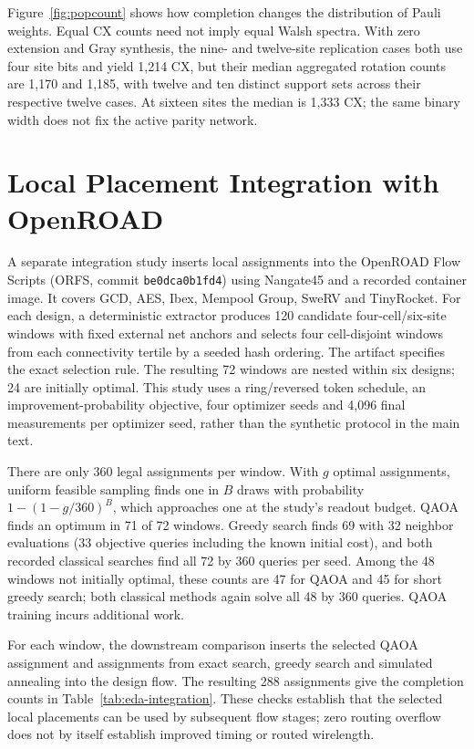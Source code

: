 \documentclass[manuscript,screen,review]{acmart}
\begin{document}
Figure~\ref{fig:popcount} shows how completion changes the distribution of
Pauli weights. Equal CX counts need not imply equal Walsh spectra. With zero extension
and Gray synthesis, the nine- and twelve-site replication cases both use four site bits and yield 1,214 CX, but their median
aggregated rotation counts are 1,170 and 1,185, with twelve and ten distinct
support sets across their respective twelve cases. At sixteen sites the
median is 1,333 CX; the
same binary width does not fix the active parity network.


\section{Local Placement Integration with OpenROAD}
\label{sec:eda}
A separate integration study inserts local assignments into the OpenROAD
Flow Scripts (ORFS, commit \texttt{be0dca0b1fd4}) using Nangate45 and a
recorded container image. It covers GCD, AES, Ibex, Mempool Group, SweRV
and TinyRocket. For each design, a deterministic extractor produces 120
candidate four-cell/six-site windows with fixed external net anchors and
selects four cell-disjoint windows from each connectivity tertile by a
seeded hash ordering. The artifact specifies the exact selection rule.
The resulting 72 windows are nested within six designs; 24 are initially
optimal. This study uses a ring/reversed token schedule, an
improvement-probability objective, four optimizer seeds and 4,096 final
measurements per optimizer seed, rather than the synthetic protocol in the main text.

There are only 360 legal assignments per window. With $g$ optimal
assignments, uniform feasible sampling finds one in $B$ draws with
probability $1-(1-g/360)^B$, which approaches one at the study's readout
budget. QAOA finds an optimum in 71 of 72 windows. Greedy search finds
69 with 32 neighbor evaluations (33 objective queries including the known
initial cost), and both recorded classical searches find all 72 by 360
queries per seed. Among the 48 windows not initially optimal, these counts
are 47 for QAOA and 45 for short greedy search; both classical methods
again solve all 48 by 360 queries. QAOA training incurs additional work.

For each window, the downstream comparison inserts the selected QAOA
assignment and assignments from exact search, greedy search and simulated
annealing into the design flow. The resulting 288 assignments give the
completion counts in Table~\ref{tab:eda-integration}. These checks establish
that the selected local placements can be used by subsequent flow stages;
zero routing overflow does not by itself establish improved timing or
routed wirelength.
\end{document}
